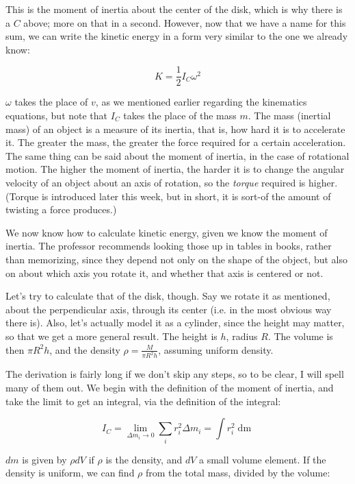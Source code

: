 \documentclass[12pt,a4paper]{report}
\begin{document}
This is the moment of inertia about the center of the disk, which is why there is a $C$ above; more on that in a second. However, now that we have a name for this sum, we can write the kinetic energy in a form very similar to the one we already know:

\begin{equation}
K = \frac{1}{2} I_C \omega^2
\end{equation}

$\omega$ takes the place of $v$, as we mentioned earlier regarding the kinematics equations, but note that $I_C$ takes the place of the mass $m$. The mass (inertial mass) of an object is a measure of its inertia, that is, how hard it is to accelerate it. The greater the mass, the greater the force required for a certain acceleration.\\
The same thing can be said about the moment of inertia, in the case of rotational motion. The higher the moment of inertia, the harder it is to change the angular velocity of an object about an axis of rotation, so the \emph{torque} required is higher. (Torque is introduced later this week, but in short, it is sort-of the amount of twisting a force produces.)

We now know how to calculate kinetic energy, given we know the moment of inertia. The professor recommends looking those up in tables in books, rather than memorizing, since they depend not only on the shape of the object, but also on about which axis you rotate it, and whether that axis is centered or not.

Let's try to calculate that of the disk, though. Say we rotate it as mentioned, about the perpendicular axis, through its center (i.e. in the most obvious way there is). Also, let's actually model it as a cylinder, since the height may matter, so that we get a more general result. The height is $h$, radius $R$. The volume is then $\pi R^2 h$, and the density $\displaystyle \rho = \frac{M}{\pi R^2 h}$, assuming uniform density.

The derivation is fairly long if we don't skip any steps, so to be clear, I will spell many of them out. We begin with the definition of the moment of inertia, and take the limit to get an integral, via the definition of the integral:

\begin{equation}
I_C = \lim_{\Delta m_i \to 0} \sum_i r_i^2 \Delta m_i = \int r_i^2 \mathop{dm}
\end{equation}

$dm$ is given by $\rho dV$ if $\rho$ is the density, and $dV$ a small volume element. If the density is uniform, we can find $\rho$ from the total mass, divided by the volume:
\end{document}
